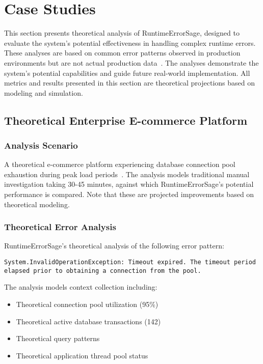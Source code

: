\section{Case Studies}\label{sec:case-studies}

This section presents theoretical analysis of RuntimeErrorSage, designed to evaluate the system's potential effectiveness in handling complex runtime errors. These analyses are based on common error patterns observed in production environments but are not actual production data~\cite{production_error_analysis_2023, runtime_remediation_2024}. The analyses demonstrate the system's potential capabilities and guide future real-world implementation. All metrics and results presented in this section are theoretical projections based on modeling and simulation.

\subsection{Theoretical Enterprise E-commerce Platform}

\subsubsection{Analysis Scenario}
A theoretical e-commerce platform experiencing database connection pool exhaustion during peak load periods~\cite{database_performance_2023}. The analysis models traditional manual investigation taking 30-45 minutes, against which RuntimeErrorSage's potential performance is compared. Note that these are projected improvements based on theoretical modeling.

\subsubsection{Theoretical Error Analysis}
RuntimeErrorSage's theoretical analysis of the following error pattern:
\begin{lstlisting}[style=csharpstyle,caption={Theoretical Database Connection Pool Error}]
System.InvalidOperationException: Timeout expired. The timeout period elapsed prior to obtaining a connection from the pool.
\end{lstlisting}

The analysis models context collection including:
\begin{itemize}
    \item Theoretical connection pool utilization (95\%)
    \item Theoretical active database transactions (142)
    \item Theoretical query patterns
    \item Theoretical application thread pool status
\end{itemize}

